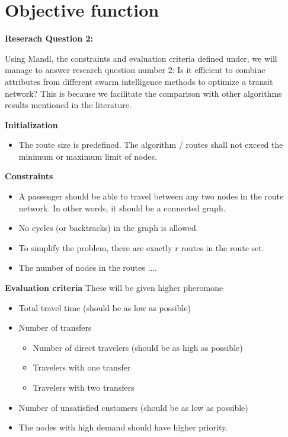 \section{Objective function}
\textbf{Reserach Question 2: }

Using Mandl, the constraints and evaluation criteria defined under, we will manage to answer research question number 2: Is it efficient to combine attributes from different swarm intelligence methods to optimize a transit network? This is because we facilitate the comparison with other algorithms results mentioned in the literature. 


\textbf{Initialization}
\begin{itemize}
\item The route size is predefined. The algorithm / routes shall not exceed the minimum or maximum limit of nodes.
\end{itemize}

\textbf{Constraints}
\begin{itemize}
\item A passenger should be able to travel between any two nodes in the route network. In other words, it should be a connected graph. 
\item No cycles (or backtracks) in the graph is allowed.
\item To simplify the problem, there are exactly r routes in the route set.
\item The number of nodes in the routes .... 
\end{itemize}

\textbf{Evaluation criteria}
These will be given higher pheromone
\begin{itemize}
\item Total travel time (should be as low as possible)
\item Number of transfers
\begin{itemize}
\item Number of direct travelers (should be as high as possible)
\item Travelers with one transfer
\item Travelers with two transfers
\end{itemize}
\item Number of unsatisfied customers (should be as low as possible)
\item The nodes with high demand should have higher priority.
\end{itemize}